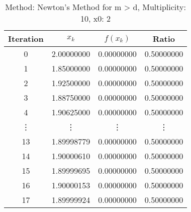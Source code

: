 \begin{table}
\centering
\caption{Method: Newton's Method for m > d, Multiplicity: 10, x0: 2}
\label{tab:table_Newton's_Method_for_m_>_d_10_2}
\begin{tabular}{c c c c}
\toprule
Iteration &      $x_k$ &   $f(x_k)$ &      Ratio \\
\midrule
        0 & 2.00000000 & 0.00000000 & 0.50000000 \\
        1 & 1.85000000 & 0.00000000 & 0.50000000 \\
        2 & 1.92500000 & 0.00000000 & 0.50000000 \\
        3 & 1.88750000 & 0.00000000 & 0.50000000 \\
        4 & 1.90625000 & 0.00000000 & 0.50000000 \\
   \vdots &     \vdots &     \vdots &     \vdots \\
       13 & 1.89998779 & 0.00000000 & 0.50000000 \\
       14 & 1.90000610 & 0.00000000 & 0.50000000 \\
       15 & 1.89999695 & 0.00000000 & 0.50000000 \\
       16 & 1.90000153 & 0.00000000 & 0.50000000 \\
       17 & 1.89999924 & 0.00000000 & 0.50000000 \\
\bottomrule
\end{tabular}
\end{table}
